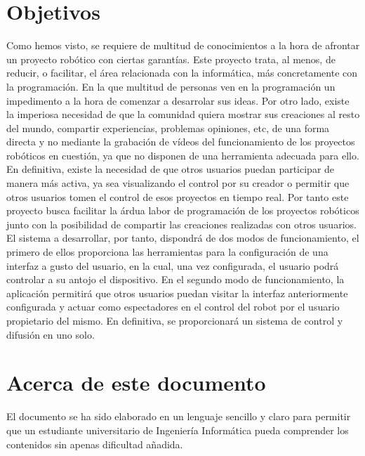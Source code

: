 


\section{Objetivos}
\label{sec:objetivos}

Como hemos visto, se requiere de multitud de conocimientos a la hora de afrontar un proyecto robótico con ciertas garantías. Este proyecto trata, al menos, de reducir, o facilitar, el área relacionada con la informática, más concretamente con la programación. En la que multitud de personas ven en la programación un impedimento a la hora de comenzar a desarrolar sus ideas.
Por otro lado, existe la imperiosa necesidad de que la comunidad quiera mostrar sus creaciones al resto del mundo, compartir experiencias, problemas opiniones, etc, de una forma directa y no
mediante la grabación de vídeos del funcionamiento de los proyectos robóticos en cuestión, ya que no disponen de una herramienta adecuada para ello. En definitiva, existe la necesidad de que otros
usuarios puedan participar de manera más activa, ya sea visualizando el control por su creador o permitir que otros usuarios tomen el control de esos proyectos en tiempo real.
Por tanto este proyecto busca facilitar la árdua labor de programación de los proyectos robóticos junto con la posibilidad de compartir las creaciones realizadas con otros usuarios.\\

El sistema a desarrollar, por tanto, dispondrá de dos modos de funcionamiento, el primero de ellos proporciona las herramientas para la configuración de una interfaz a gusto del usuario, en la cual, una vez configurada, el usuario podrá controlar a su antojo el dispositivo. En el segundo modo de funcionamiento, la aplicación permitirá que otros usuarios puedan visitar la interfaz anteriormente configurada y actuar como espectadores en el control del robot por el usuario propietario del mismo. En definitiva, se proporcionará un sistema de control y difusión en uno solo.\\

\section{Acerca de este documento}

El documento se ha sido elaborado en un lenguaje sencillo y claro para permitir que un estudiante universitario de Ingeniería Informática pueda comprender los contenidos sin apenas dificultad añadida.\\

